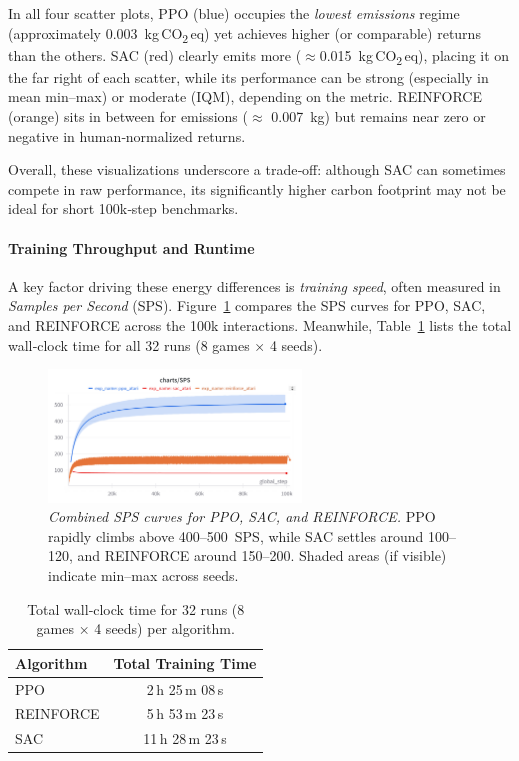 In all four scatter plots, PPO (blue) occupies the \emph{lowest emissions} regime (approximately \num{0.003}~kg\,CO\textsubscript{2}\,eq) yet achieves higher (or comparable) returns than the others. SAC (red) clearly emits more ($\approx$\num{0.015}~kg\,CO\textsubscript{2}\,eq), placing it on the far right of each scatter, while its performance can be strong (especially in mean min–max) or moderate (IQM), depending on the metric. REINFORCE (orange) sits in between for emissions ($\approx$ \num{0.007}~kg) but remains near zero or negative in human‐normalized returns.

Overall, these visualizations underscore a trade‐off: although SAC can sometimes compete in raw performance, its significantly higher carbon footprint may not be ideal for short 100k‐step benchmarks.

\paragraph{Training Throughput and Runtime}
A key factor driving these energy differences is \emph{training speed}, often measured in \emph{Samples per Second} (SPS). Figure~\ref{fig:policy_sps_comparison} compares the SPS curves for PPO, SAC, and REINFORCE across the 100k interactions. Meanwhile, Table~\ref{tab:policy_training_time} lists the total wall‐clock time for all 32 runs (8 games × 4 seeds).

\begin{figure} 
	\centering
	\includegraphics[width=0.6\textwidth]{figures/policy_comparison/policy_sps_comparison.png}
	\caption{\emph{Combined SPS curves for PPO, SAC, and REINFORCE.}
		PPO rapidly climbs above 400--500~SPS, while SAC settles around 100--120, and REINFORCE around 150--200. 
		Shaded areas (if visible) indicate min--max across seeds.}
	\label{fig:policy_sps_comparison}
\end{figure}

\begin{table} 
	\centering
	\caption{Total wall‐clock time for 32 runs (8 games × 4 seeds) per algorithm.}
	\label{tab:policy_training_time}
	\begin{tabular}{lc}
		\toprule
		\textbf{Algorithm} & \textbf{Total Training Time}\\
		\midrule
		PPO         & 2\,h 25\,m 08\,s \\
		REINFORCE   & 5\,h 53\,m 23\,s \\
		SAC         & 11\,h 28\,m 23\,s \\
		\bottomrule
	\end{tabular}
\end{table}


